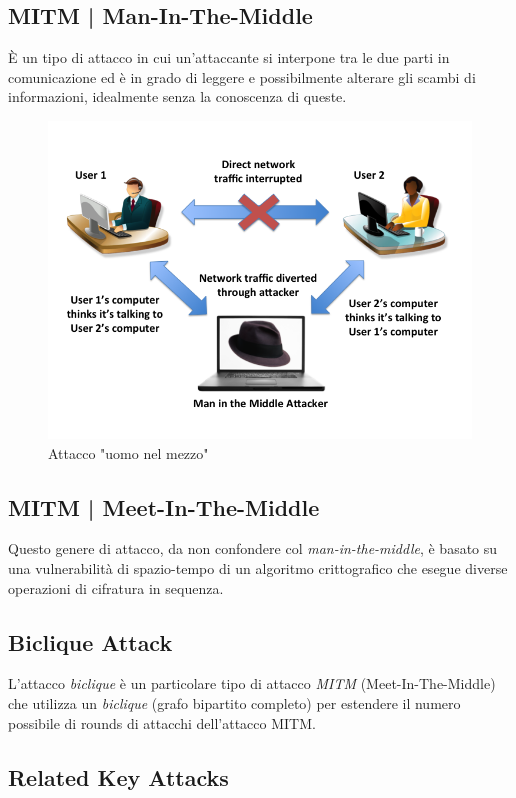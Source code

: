 \subsection{MITM | Man-In-The-Middle}

\textsf{\small È un tipo di attacco in cui un'attaccante si interpone tra le due parti in comunicazione ed è in grado di leggere e possibilmente alterare gli scambi di informazioni, idealmente senza la conoscenza di queste. }

\begin{figure}[H]
	\centering
	\includegraphics[width=.6\textwidth, height=.6\textheight, keepaspectratio]{./images/attacks/man_in_the_middle.png}
	\caption{Attacco "uomo nel mezzo"}
	\label{fig:man_in_the_middle}
\end{figure}

\subsection{MITM | Meet-In-The-Middle}

\textsf{\small Questo genere di attacco, da non confondere col \emph{man-in-the-middle}, è basato su una vulnerabilità di spazio-tempo di un algoritmo crittografico che esegue diverse operazioni di cifratura in sequenza.}

\subsection{Biclique Attack}

\textsf{\small L'attacco \emph{biclique} è un particolare tipo di attacco \emph{MITM} (Meet-In-The-Middle) che utilizza un \emph{biclique} (grafo bipartito completo) per estendere il numero possibile di rounds di attacchi dell'attacco MITM.}

\subsection{Related Key Attacks}

